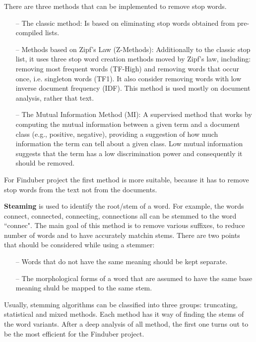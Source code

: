 There are three methods that can be implemented to remove stop words. 
\begin{itemize}

\item[--]{The classic method:} Is based on eliminating stop words obtained from pre-compiled lists.

\item[--]{Methods based on Zipf's Law (Z-Methods):} Additionally to the classic stop list, it uses three stop word creation methods moved by Zipf's law, including: removing most frequent words (TF-High) and removing words that occur once, i.e. singleton words (TF1). It also consider removing words with low inverse document frequency (IDF). This method is used mostly on document analysis, rather that text.

\item[--]{The Mutual Information Method (MI):} A supervised method that works by computing the mutual information between a given term and a document class (e.g., positive, negative), providing a suggestion of how much information the term can tell about a given class. Low mutual information suggests that the term has a low discrimination power and consequently it should be removed.\cite{MI}

\end{itemize}
For Finduber project the first method is more suitable, because it has to remove stop words from the text not from the documents.

\textbf{Steaming} is used to identify the root/stem of a word. For example, the words connect, connected, connecting, connections all can be stemmed to the word ``connec". \cite{stemming} The main goal of this method is to remove various suffixes, to reduce number of words and to have accurately matchin stems. There are two points that should be considered while using a stemmer:

\begin{itemize}
\item[--] Words that do not have the same meaning should be kept separate.
\item[--] The morphological forms of a word that are assumed to have the same base meaning shuld be mapped to the same stem. 
\end{itemize}

Usually, stemming algorithms can be classified into three groups: truncating, statistical and mixed methods. Each method has it way of finding the stems of the word variants. After a deep analysis of all method, the first one turns out to be the most efficient for the Finduber project. 

